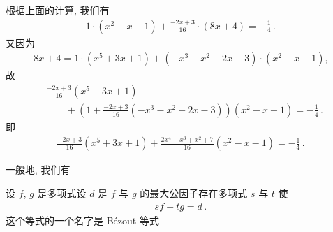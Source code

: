 根据上面的计算, 我们有
\begin{align*}
    1 \cdot (x^2 - x - 1) + \frac{-2x + 3}{16} \cdot (8x + 4) = -\frac{1}{4} \period
\end{align*}
又因为
\begin{align*}
    8x + 4 = 1 \cdot (x^5 + 3x + 1) + (-x^3 - x^2 - 2x - 3) \cdot (x^2 - x - 1),
\end{align*}
故
\begin{align*}
     & \frac{-2x+3}{16} (x^5 + 3x + 1)                                                                   \\
     & \qquad + \left( 1 + \frac{-2x+3}{16} (-x^3-x^2-2x-3) \right) (x^2 - x - 1) = -\frac{1}{4} \period
\end{align*}
即
\begin{align*}
    \frac{-2x+3}{16} (x^5 + 3x + 1) + \frac{2x^4-x^3+x^2+7}{16} (x^2 - x - 1) = -\frac{1}{4} \period
\end{align*}

一般地, 我们有
\begin{proposition}
    设 $f$, $g$ 是多项式\period 设 $d$ 是 $f$ 与 $g$ 的最大公因子\period 存在多项式 $s$ 与 $t$ 使
    \begin{align*}
        sf + tg = d \period
    \end{align*}
    这个等式的一个名字是 Bézout 等式 \period
\end{proposition}

